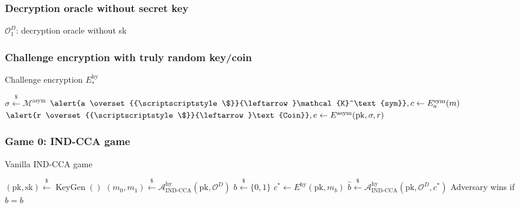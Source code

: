 \documentclass{beamer}
\newcommand{\leftsample}{\overset{{\scriptscriptstyle\$}}{\leftarrow}}
\begin{document}
\begin{frame}
    \frametitle{Decryption oracle without secret key}

    \begin{algorithm}[H]
    \SetAlgoLined
    \caption{$\mathcal{O}^D_1$: decryption oracle without sk}
    
    \Return{$\bot$}\;
    \end{algorithm}
\end{frame}

\begin{frame}
    \frametitle{Challenge encryption with truly random key/coin}

    \begin{algorithm}[H]
    \SetAlgoLined
    \caption{Challenge encryption $E^\text{hy}_\ast$}

    $\sigma \leftsample \mathcal{M}^\text{asym}$\;
    $
        \alert{a \leftsample \mathcal{K}^\text{sym}},
        c \leftarrow E^\text{sym}_a(m)
    $\;
    $
        \alert{r \leftsample \text{Coin}}, 
        e \leftarrow E^\text{asym}(\operatorname{pk}, \sigma, r)
    $
    \;
    \;
    \end{algorithm}

\end{frame}

\begin{frame}
    \frametitle{Game 0: IND-CCA game}

    \begin{algorithm}[H]
    \SetAlgoLined
    \caption{Vanilla IND-CCA game}
    $(\text{pk}, \text{sk}) \leftsample \operatorname{KeyGen}()$\;
    $(m_0, m_1) \leftsample
        \mathcal{A}^\text{hy}_\text{IND-CCA}(\text{pk}, \mathcal{O}^D)
    $\;
    $b \leftsample \{0, 1\}$\;
    $c^\ast \leftarrow E^\text{hy}(\text{pk}, m_b)$\;
    $\hat{b} \leftsample \mathcal{A}^\text{hy}_\text{IND-CCA}(
        \text{pk}, \mathcal{O}^D, c^\ast
    )$\;
    Adversary wins if $\hat{b} = b$\;

    \end{algorithm}

\end{frame}
\end{document}
